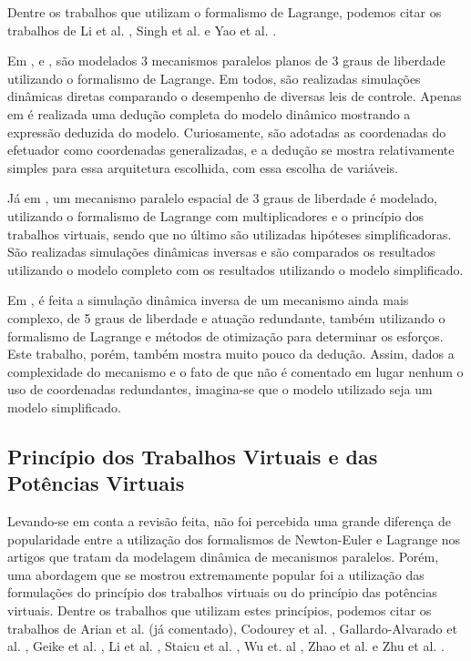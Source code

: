 \documentclass[]{politex}
\begin{document}
Dentre os trabalhos que utilizam o formalismo de Lagrange, podemos citar os trabalhos de  Li et al. \cite{Li3}, Singh et al. \cite{Singh, Singh2, Singh3} e Yao et al. \cite{Yao}.

Em \cite{Singh}, \cite{Singh2} e \cite{Singh3}, são modelados 3 mecanismos paralelos planos de 3 graus de liberdade utilizando o formalismo de Lagrange. Em todos, são realizadas simulações dinâmicas diretas comparando o desempenho de diversas leis de controle. Apenas em \cite{Singh2} é realizada uma dedução completa do modelo dinâmico mostrando a expressão deduzida do modelo. Curiosamente, são adotadas as coordenadas do efetuador como coordenadas generalizadas, e a dedução se mostra relativamente simples para essa arquitetura escolhida, com essa escolha de variáveis.

Já em \cite{Li3}, um mecanismo paralelo espacial de 3 graus de liberdade é modelado, utilizando o formalismo de Lagrange com multiplicadores e o princípio dos trabalhos virtuais, sendo que no último são utilizadas hipóteses simplificadoras. São realizadas simulações dinâmicas inversas e são comparados os resultados utilizando o modelo completo com os resultados utilizando o modelo simplificado.

Em \cite{Yao}, é feita a simulação dinâmica inversa de um mecanismo ainda mais complexo, de 5 graus de liberdade e atuação redundante, também utilizando o formalismo de Lagrange e métodos de otimização para determinar os esforços. Este trabalho, porém, também mostra muito pouco da dedução. Assim, dados a complexidade do mecanismo e o fato de que não é comentado em lugar nenhum o uso de coordenadas redundantes, imagina-se que o modelo utilizado seja um modelo simplificado.

\subsection{Princípio dos Trabalhos Virtuais e das Potências Virtuais}

Levando-se em conta a revisão feita, não foi percebida uma grande diferença de popularidade entre a utilização dos formalismos de Newton-Euler e Lagrange nos artigos que tratam da modelagem dinâmica de mecanismos paralelos. Porém, uma abordagem que se mostrou extremamente popular foi a utilização das formulações do princípio dos trabalhos virtuais ou do princípio das potências virtuais. Dentre os trabalhos que utilizam estes princípios, podemos citar os trabalhos de Arian et al. \cite{Arian} (já comentado), Codourey et al. \cite{Codourey, CodoureyBurdet}, Gallardo-Alvarado et al. \cite{GallardoAlvarado}, Geike et al. \cite{Geike}, Li et al. \cite{LiStaicu, Li}, Staicu et al. \cite{Staicu, Staicu2, Staicu3, StaicuCarpCiocardia, StaicuLiu, StaicuZhang, StaicuZhangRugescu}, Wu et. al \cite{Wu}, Zhao et al. \cite{Zhao, Zhao2} e  Zhu et al. \cite{Zhu}.
\end{document}
